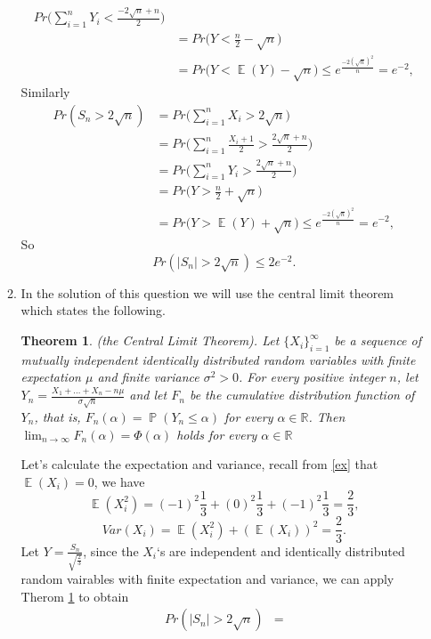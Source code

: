 \documentclass[a4paper, 11pt, oneside]{article}
\newtheorem{theorem}{Theorem}[section]
\newcommand{\R}{\mathbb{R}}
\newcommand\abs[1]{\left|#1\right|}
\DeclareMathOperator{\EX}{\mathbb{E}}
\DeclareMathOperator{\PX}{\mathbb{P}}
\begin{document}
\begin{enumerate}
\begin{enumerate}
\begin{align*}
 Pr\bigg(\sum_{i=1}^nY_i<\frac{-2\sqrt{n}+n}{2}\bigg)\\&=
 Pr\bigg(Y<\frac{n}{2} - \sqrt{n}\bigg)\\&=
  Pr\bigg(Y<\EX(Y) - \sqrt{n}\bigg) \leq e^{\frac{-2(\sqrt{n})^2}{n}} = e^{-2},
\end{align*}
Similarly
\begin{align*}
 Pr(S_n>2\sqrt{n}) &=
 Pr\bigg(\sum_{i=1}^nX_i>2\sqrt{n}\bigg) \\&=
 Pr\bigg(\sum_{i=1}^n\frac{X_i+1}{2}>\frac{2\sqrt{n}+n}{2}\bigg)\\&=
 Pr\bigg(\sum_{i=1}^nY_i>\frac{2\sqrt{n}+n}{2}\bigg)\\&=
 Pr\bigg(Y>\frac{n}{2} + \sqrt{n}\bigg)\\&=
  Pr\bigg(Y>\EX(Y) + \sqrt{n}\bigg) \leq e^{\frac{-2(\sqrt{n})^2}{n}} = e^{-2},
\end{align*}
So
\begin{equation*}
Pr(\abs{S_n}>2\sqrt{n}) \leq 2 e^{-2}.
 \end{equation*}
 \item  In the solution of this question we will use the central limit theorem which states the following.
\begin{theorem} 
\label{central}
(the Central Limit Theorem). Let $\{X_i\}^\infty_{i=1}$ be a sequence of mutually independent identically distributed random variables 
with finite expectation $\mu$ and finite variance $\sigma^2>0$. For every positive integer $n$, let $Y_n = \frac{X_1 + \ldots + X_n - n \mu}{\sigma\sqrt{n}}$
and let $F_n$ be the cumulative distribution function of $Y_n$, that is, $F_n(\alpha) = \PX(Y_n\leq\alpha)$ for every $\alpha\in \R$. 
Then $\lim_{n \to \infty} F_n(\alpha) = \Phi(\alpha)$ holds for every $\alpha \in \R$
\end{theorem} 
Let's calculate the expectation and variance, recall from \ref{ex} that $\EX(X_i) = 0$, we have
\begin{equation*}
\EX(X_i^2) = (-1)^2 \frac{1}{3} + (0)^2 \frac{1}{3} + (-1)^2 \frac{1}{3} = \frac{2}{3},
 \end{equation*}
\begin{equation*}
Var(X_i) = \EX(X_i^2) + (\EX(X_i))^2 = \frac{2}{3}.
 \end{equation*}
 Let $Y = \frac{S_n}{\sqrt{\frac{2}{3}}}$,
since the $X_i$`s are independent and identically distributed random vairables with finite expectation and variance, 
 we can apply Therom \ref{central} to obtain
 \begin{align*}
Pr(\abs{S_n}>2\sqrt{n}) &=

\end{align*}
\end{enumerate}
\end{enumerate}
\end{document}
